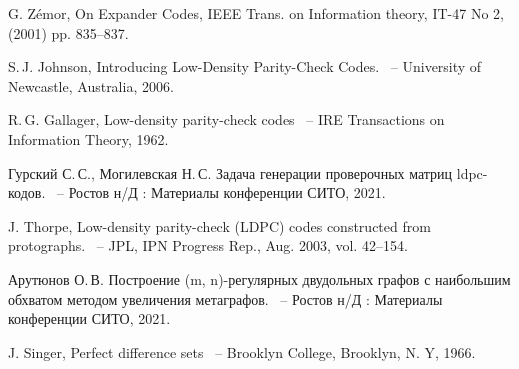\documentclass[14pt]{mmcs-article}
\begin{document}
\begin{thebibliography}{0}

G. Zémor, On Expander Codes, IEEE Trans. on Information theory, IT-47
No 2, (2001) pp. 835–837.
  
S.\,J. Johnson,
Introducing Low-Density Parity-Check Codes.
~-- University of Newcastle, Australia, 2006.

R.\,G. Gallager,
Low-density parity-check codes
~-- IRE Transactions on Information Theory, 1962.

Гурский С.\,С., Могилевская Н.\,С.
Задача генерации проверочных матриц ldpc-кодов.
~-- Ростов н/Д : Материалы конференции СИТО, 2021.

J. Thorpe,
Low-density parity-check (LDPC) codes constructed from protographs.
~-- JPL, IPN Progress Rep., Aug. 2003, vol. 42–154.

Арутюнов О.\,В.
Построение (m, n)-регулярных двудольных графов с наибольшим обхватом методом увеличения метаграфов.
~-- Ростов н/Д : Материалы конференции СИТО, 2021.

J. Singer,
Perfect difference sets
~-- Brooklyn College, Brooklyn, N. Y, 1966.

\end{thebibliography}
\end{document}
